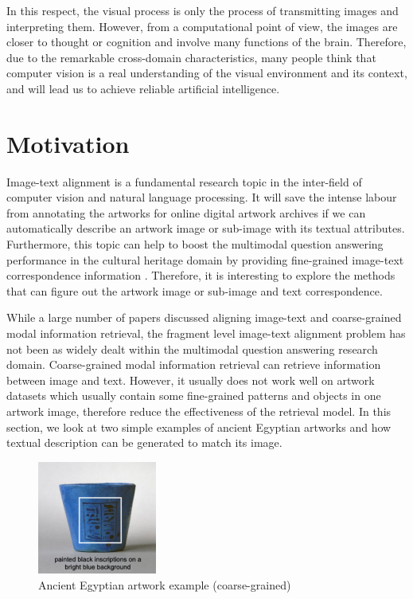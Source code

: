 In this respect, the visual process is only the process of transmitting images and interpreting them. However, from a computational point of view, the images are closer to thought or cognition and involve many functions of the brain. Therefore, due to the remarkable cross-domain characteristics, many people think that computer vision is a real understanding of the visual environment and its context, and will lead us to achieve reliable artificial intelligence.

\section{Motivation}
Image-text alignment is a fundamental research topic in the inter-field of computer vision and natural language processing. It will save the intense labour from annotating the artworks for online
digital artwork archives if we can automatically describe an artwork image or sub-image with its textual attributes. Furthermore, this topic can help to boost the multimodal question answering performance in the cultural heritage domain by providing fine-grained image-text correspondence information \cite{mqa}. Therefore, it is interesting to explore the methods that can figure out the artwork image or sub-image and text correspondence.

While a large number of papers discussed aligning image-text and coarse-grained modal information retrieval, the fragment level image-text alignment problem has not been as widely dealt within the multimodal question answering research domain. Coarse-grained modal information retrieval can retrieve information between image and text. However, it usually does not work well on artwork datasets which usually contain some fine-grained patterns and objects in one artwork image, therefore reduce the effectiveness of the retrieval model. In this section, we look at two simple examples of ancient Egyptian artworks and how textual description can be generated to match its image.

\begin{figure}[h!]
\centering
\includegraphics[width=0.35\textwidth]{artwork_fine1.pdf}
\caption{Ancient Egyptian artwork example (coarse-grained)}
\label{fig:artwork1}
\end{figure}

